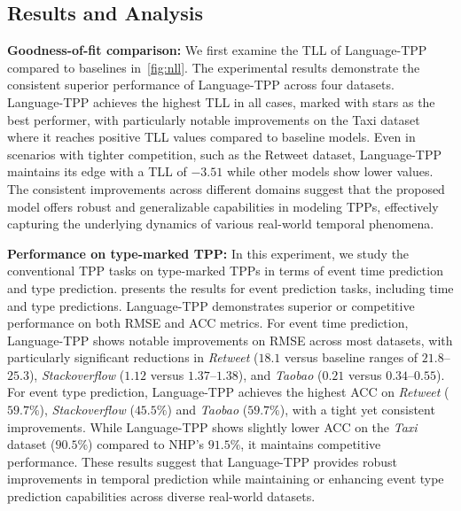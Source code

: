 \subsection{Results and Analysis}

\textbf{Goodness-of-fit comparison:} We first examine the TLL of Language-TPP compared to baselines in~\cref{fig:nll}. The experimental results demonstrate the consistent superior performance of Language-TPP across four datasets. Language-TPP achieves the highest TLL in all cases, marked with stars as the best performer, with particularly notable improvements on the Taxi dataset where it reaches positive TLL values compared to baseline models. Even in scenarios with tighter competition, such as the Retweet dataset, Language-TPP maintains its edge with a TLL of $-3.51$ while other models show lower values. The consistent improvements across different domains suggest that the proposed model offers robust and generalizable capabilities in modeling TPPs, effectively capturing the underlying dynamics of various real-world temporal phenomena. 


\textbf{Performance on type-marked TPP:}
In this experiment, we study the conventional TPP tasks on type-marked TPPs in terms of event time prediction and type prediction. 
 presents the results for event prediction tasks, including time and type predictions. Language-TPP demonstrates superior or competitive performance on both RMSE and ACC metrics. 
For event time prediction, Language-TPP shows notable improvements on RMSE across most datasets, with particularly significant reductions in \textit{Retweet} ($18.1$ versus baseline ranges of $21.8$--$25.3$), \textit{Stackoverflow} ($1.12$ versus $1.37$--$1.38$), and \textit{Taobao} ($0.21$ versus $0.34$--$0.55$). 
For event type prediction, Language-TPP achieves the highest ACC on \textit{Retweet} ($59.7\%$), \textit{Stackoverflow} ($45.5\%$) and \textit{Taobao} ($59.7\%$), with a tight yet consistent improvements. While Language-TPP shows slightly lower ACC on the \textit{Taxi} dataset ($90.5\%$) compared to NHP's $91.5\%$, it maintains competitive performance. 
These results suggest that Language-TPP provides robust improvements in temporal prediction while maintaining or enhancing event type prediction capabilities across diverse real-world datasets. 


